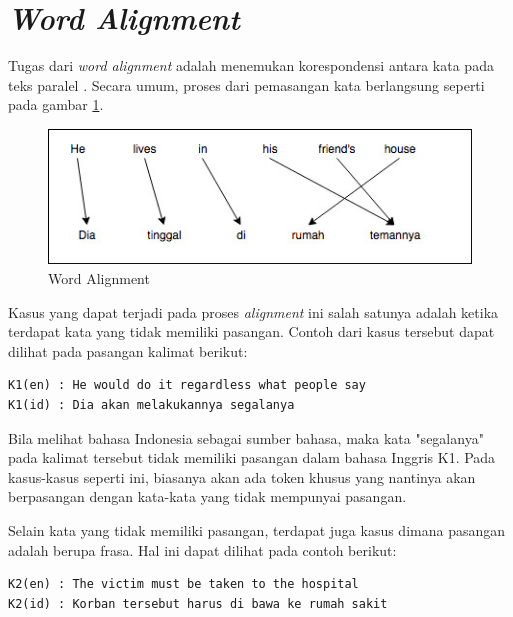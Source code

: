 \section{\textit{Word Alignment}}
Tugas dari \textit{word alignment} adalah menemukan korespondensi antara kata pada teks paralel 
\citep{mihalcea2003evaluation}. Secara umum, proses dari pemasangan kata berlangsung seperti pada gambar \ref{fig:word-alignment}.


\begin{figure}
	\centering
	\includegraphics[width=1\linewidth]{adit_pics/wordalignment.jpeg}
	\caption{Word Alignment}
	\label{fig:word-alignment}
\end{figure}

Kasus yang dapat terjadi pada proses \textit{alignment} ini salah satunya adalah ketika terdapat kata yang tidak memiliki pasangan. Contoh dari kasus tersebut dapat dilihat pada pasangan kalimat berikut:

\begin{lstlisting}[backgroundcolor = \color{white}]
K1(en) : He would do it regardless what people say
K1(id) : Dia akan melakukannya segalanya
\end{lstlisting}


Bila melihat bahasa Indonesia sebagai sumber bahasa, maka kata "segalanya" pada kalimat tersebut tidak memiliki pasangan dalam bahasa Inggris K1. Pada kasus-kasus seperti ini, biasanya akan ada token khusus yang nantinya akan berpasangan dengan kata-kata yang tidak mempunyai pasangan.

Selain kata yang tidak memiliki pasangan, terdapat juga kasus dimana pasangan adalah berupa frasa. Hal ini dapat dilihat pada contoh berikut:

\begin{lstlisting}[backgroundcolor = \color{white}]
K2(en) : The victim must be taken to the hospital
K2(id) : Korban tersebut harus di bawa ke rumah sakit
\end{lstlisting}


